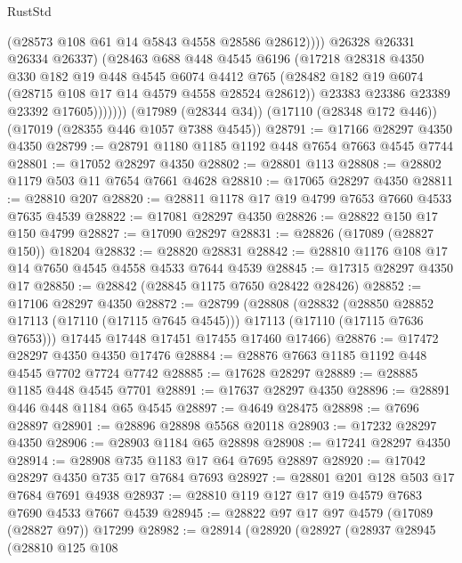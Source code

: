 \begin{lexlean}{RustStd}
\begin{coremodule}
                      (@28573 @108 @61 @14 @5843 @4558 @28586 @28612))))
                @26328
                @26331
                @26334
                @26337)
              (@28463
                @688
                @448
                @4545
                @6196
                (@17218
                  @28318
                  @4350
                  @330
                  @182
                  @19
                  @448
                  @4545
                  @6074
                  @4412
                  @765
                  (@28482 @182 @19 @6074 (@28715 @108 @17 @14 @4579 @4558 @28524 @28612))
                  @23383
                  @23386
                  @23389
                  @23392
                  @17605)))))))
    (@17989 (@28344 @34))
    (@17110 (@28348 @172 @446))
    (@17019 (@28355 @446 @1057 @7388 @4545))
@28791 := @17166 @28297 @4350 @4350
@28799 := @28791 @1180 @1185 @1192 @448 @7654 @7663 @4545 @7744
@28801 := @17052 @28297 @4350
@28802 := @28801 @113
@28808 := @28802 @1179 @503 @11 @7654 @7661 @4628
@28810 := @17065 @28297 @4350
@28811 := @28810 @207
@28820 := @28811 @1178 @17 @19 @4799 @7653 @7660 @4533 @7635 @4539
@28822 := @17081 @28297 @4350
@28826 := @28822 @150 @17 @150 @4799
@28827 := @17090 @28297
@28831 := @28826 (@17089 (@28827 @150)) @18204
@28832 := @28820 @28831
@28842 := @28810 @1176 @108 @17 @14 @7650 @4545 @4558 @4533 @7644 @4539
@28845 := @17315 @28297 @4350 @17
@28850 := @28842 (@28845 @1175 @7650 @28422 @28426)
@28852 := @17106 @28297 @4350
@28872 := @28799
    (@28808
      (@28832
        (@28850 @28852 @17113 (@17110 (@17115 @7645 @4545)))
        @17113
        (@17110 (@17115 @7636 @7653)))
      @17445
      @17448
      @17451
      @17455
      @17460
      @17466)
@28876 := @17472 @28297 @4350 @4350 @17476
@28884 := @28876 @7663 @1185 @1192 @448 @4545 @7702 @7724 @7742
@28885 := @17628 @28297
@28889 := @28885 @1185 @448 @4545 @7701
@28891 := @17637 @28297 @4350
@28896 := @28891 @446 @448 @1184 @65 @4545
@28897 := @4649 @28475
@28898 := @7696 @28897
@28901 := @28896 @28898 @5568 @20118
@28903 := @17232 @28297 @4350
@28906 := @28903 @1184 @65 @28898
@28908 := @17241 @28297 @4350
@28914 := @28908 @735 @1183 @17 @64 @7695 @28897
@28920 := @17042 @28297 @4350 @735 @17 @7684 @7693
@28927 := @28801 @201 @128 @503 @17 @7684 @7691 @4938
@28937 := @28810 @119 @127 @17 @19 @4579 @7683 @7690 @4533 @7667 @4539
@28945 := @28822 @97 @17 @97 @4579 (@17089 (@28827 @97)) @17299
@28982 := @28914
    (@28920
      (@28927
        (@28937
          @28945
          (@28810
            @125
            @108

\end{coremodule}
\end{lexlean}

